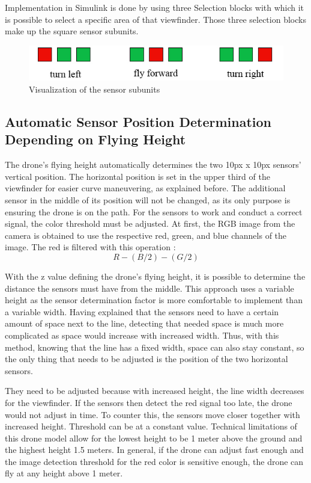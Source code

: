 \documentclass[a4paper, 10pt, conference]{IEEEtran}
\begin{document}
Implementation in Simulink is done by using three Selection blocks with which it is possible to select a specific area of that viewfinder. Those three selection blocks make up the square sensor subunits.\\
\begin{figure}
    \includegraphics[width=\linewidth]{fig1.jpg}
    \caption{Visualization of the sensor subunits}
    \label{fig:my_label}
\end{figure}


\subsection{Automatic Sensor Position Determination Depending on Flying Height}
The drone’s flying height automatically determines the two 10px x 10px sensors’ vertical position. The horizontal position is set in the upper third of the viewfinder for easier curve maneuvering, as explained before. The additional sensor in the middle of its position will not be changed, as its only purpose is ensuring the drone is on the path. For the sensors to work and conduct a correct signal, the color threshold must be adjusted. 
At first, the RGB image from the camera is obtained to use the respective red, green, and blue channels of the image. The red is filtered with this operation \cite{3}:\\
\begin{equation}
     R - (B/2) - (G/2)
\end{equation}\par

With the z value defining the drone’s flying height, it is possible to determine the distance the sensors must have from the middle. This approach uses a variable height as the sensor determination factor is more comfortable to implement than a variable width. Having explained that the sensors need to have a certain amount of space next to the line, detecting that needed space is much more complicated as space would increase with increased width. Thus, with this method, knowing that the line has a fixed width, space can also stay constant, so the only thing that needs to be adjusted is the position of the two horizontal sensors. \\\par
They need to be adjusted because with increased height, the line width decreases for the viewfinder. If the sensors then detect the red signal too late, the drone would not adjust in time. To counter this, the sensors move closer together with increased height. Threshold can be at a constant value.
Technical limitations of this drone model allow for the lowest height to be 1 meter above the ground and the highest height 1.5 meters. In general, if the drone can adjust fast enough and the image detection threshold for the red color is sensitive enough, the drone can fly at any height above 1 meter.\\
\end{document}

